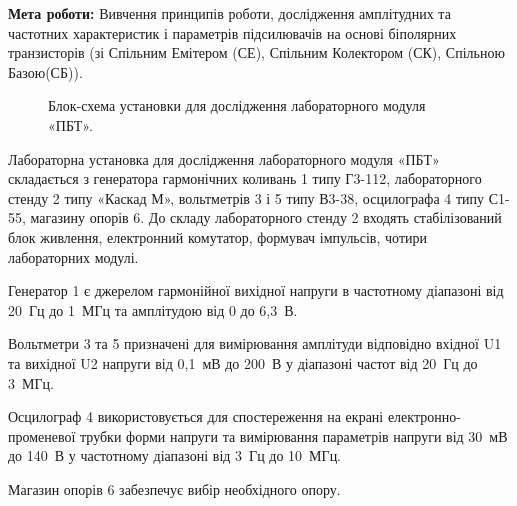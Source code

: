 \documentclass[a4paper,14pt]{extreport}
\begin{document}

\newpage
\setcounter{page}{2}

\textbf{Мета роботи:} Вивчення принципів роботи, дослідження амплітудних та частотних характеристик і параметрів підсилювачів на основі біполярних транзисторів (зі Спільним Емітером (СЕ), Спільним Колектором (СК), Спільною Базою(СБ)).



\begin{figure}[h]
\caption{Блок-схема установки для дослідження лабораторного модуля «ПБТ».}
\label{ris1}
\end{figure}
Лабораторна установка для дослідження лабораторного модуля «ПБТ» складається з генератора гармонічних коливань 1 типу Г3-112, лабораторного стенду 2 типу «Каскад М», вольтметрів 3 і 5 типу В3-38, осцилографа 4 типу С1-55, магазину опорів 6. До складу лабораторного стенду 2 входять стабілізований блок живлення, електронний комутатор, формувач імпульсів, чотири лабораторних модулі.\par
Генератор 1 є джерелом гармонійної вихідної напруги в частотному діапазоні від 20 Гц до 1 МГц та амплітудою від 0 до 6,3 В.\par
Вольтметри 3 та 5 призначені для вимірювання амплітуди відповідно вхідної U1 та вихідної U2 напруги від 0,1 мВ до 200 В у діапазоні частот від 20 Гц до 3 МГц.\par
Осцилограф 4 використовується для спостереження на екрані електронно-променевої трубки форми напруги та вимірювання параметрів напруги від 30 мВ до 140 В у частотному діапазоні від 3 Гц до 10 МГц.\par
Магазин опорів 6 забезпечує вибір необхідного опору.
\end{document}
